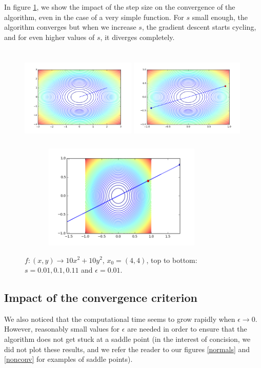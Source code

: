 In figure \ref{bowls}, we show the impact of the step size on the convergence of the algorithm, even in the case of a very simple function. For $s$ small enough, the algorithm converges but when we increase $s$, the gradient descent starts cycling, and for even higher values of $s$, it diverges completely.
\begin{figure}[h!]
  \centering
 \includegraphics[width=5.5cm,height = 5cm]{../Figures/Q1/bowl.png}
  \includegraphics[width=5.5cm,height = 5cm]{../Figures/Q1/bowl2.png}
   \includegraphics[width=10cm, height = 5cm]{../Figures/Q1/bowl3.png}
\caption{$f : (x,y) \to 10x^2 + 10y^2$, $x_0 = (4,4)$, top to bottom: $s = 0.01, 0.1, 0.11$ and $\epsilon = 0.01$.}
\label{bowls}
\end{figure}

\subsection{Impact of the convergence criterion}
We also noticed that the computational time seems to grow rapidly when $\epsilon \to 0$. However, reasonably small values for $\epsilon$ are needed in order to ensure that the algorithm does not get stuck at a saddle point (in the interest of concision, we did not plot these results, and we refer the reader to our figures \ref{normals} and \ref{nonconv} for examples of saddle points).


